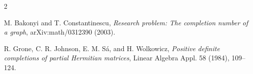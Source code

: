 \documentclass[11pt]{amsart}
\begin{document}
\begin{thebibliography}{2}

M. Bakonyi and T. Constantinescu,
\emph{Research problem: The completion number of a graph},
arXiv:math/0312390 (2003).

R. Grone, C. R. Johnson, E. M. S\'{a}, and H. Wolkowicz,
\emph{Positive definite completions of partial Hermitian matrices},
Linear Algebra Appl. 58 (1984), 109--124.

\end{thebibliography}
\end{document}
